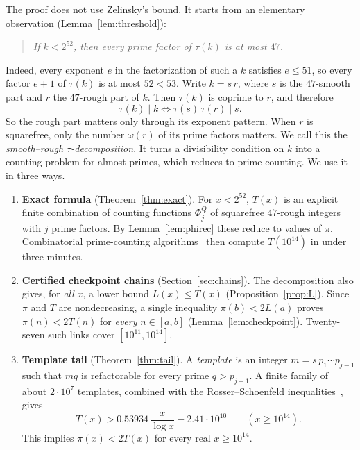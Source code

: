 \documentclass[11pt,a4paper]{article}
\theoremstyle{definition}
\begin{document}
The proof does not use Zelinsky's bound. It starts from an elementary observation (Lemma~\ref{lem:threshold}):
\begin{quote}
\emph{If $k<2^{52}$, then every prime factor of $\tau(k)$ is at most $47$.}
\end{quote}
Indeed, every exponent $e$ in the factorization of such a $k$ satisfies $e\le51$, so every factor $e+1$ of $\tau(k)$ is at most $52<53$. Write $k=s\,r$, where $s$ is the $47$-smooth part and $r$ the $47$-rough part of $k$. Then $\tau(k)$ is coprime to $r$, and therefore
\[
\tau(k)\mid k\iff \tau(s)\,\tau(r)\mid s .
\]
So the rough part matters only through its exponent pattern. When $r$ is squarefree, only the number $\omega(r)$ of its prime factors matters. We call this the \emph{smooth--rough $\tau$-decomposition}. It turns a divisibility condition on $k$ into a counting problem for almost-primes, which reduces to prime counting. We use it in three ways.

\begin{enumerate}
\item[(A)] \textbf{Exact formula} (Theorem~\ref{thm:exact}). For $x<2^{52}$, $T(x)$ is an explicit finite combination of counting functions $\Phi^{Q}_j$ of squarefree $47$-rough integers with $j$ prime factors. By Lemma~\ref{lem:phirec} these reduce to values of $\pi$. Combinatorial prime-counting algorithms~\cite{DR96,Go01,primecount} then compute $T(10^{14})$ in under three minutes.
\item[(B)] \textbf{Certified checkpoint chains} (Section~\ref{sec:chains}). The decomposition also gives, for \emph{all} $x$, a lower bound $L(x)\le T(x)$ (Proposition~\ref{prop:L}). Since $\pi$ and $T$ are nondecreasing, a single inequality $\pi(b)<2L(a)$ proves $\pi(n)<2T(n)$ for \emph{every} $n\in[a,b]$ (Lemma~\ref{lem:checkpoint}). Twenty-seven such links cover $[10^{11},10^{14}]$.
\item[(C)] \textbf{Template tail} (Theorem~\ref{thm:tail}). A \emph{template} is an integer $m=s\,p_1\cdots p_{j-1}$ such that $mq$ is refactorable for every prime $q>p_{j-1}$. A finite family of about $2\cdot10^7$ templates, combined with the Rosser--Schoenfeld inequalities~\cite{RS62}, gives
\[
T(x)>0.53934\,\frac{x}{\log x}-2.41\cdot 10^{10}\qquad(x\ge10^{14}).
\]
This implies $\pi(x)<2T(x)$ for every real $x\ge10^{14}$.
\end{enumerate}
\end{document}
